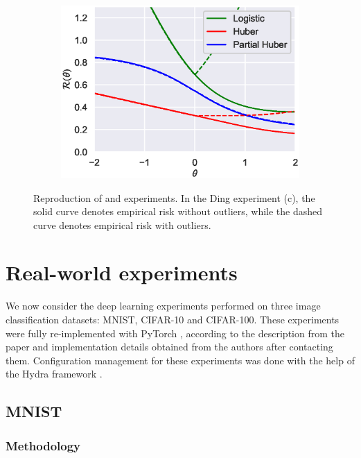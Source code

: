 \begin{figure}[htp]
\begin{subfigure}{0.31\linewidth}
        \includegraphics[width=\columnwidth]{figs/ding_outlier.eps}
    \label{fig:ding-outlier}
  \end{subfigure}
  \caption{Reproduction of \citet{long_random_2010} and \citet{ding_statistical_2013} experiments. 
  In the Ding experiment (c), the solid curve denotes empirical risk without outliers, while the dashed curve denotes empirical risk with outliers.
  }
  \label{fig:synthetic}
\end{figure}

\section{Real-world experiments}
\label{sec:realworld}

We now consider the deep learning experiments performed on three image classification datasets: MNIST, CIFAR-10 and CIFAR-100. These experiments were fully re-implemented with PyTorch \citep{paszke_pytorch_2019}, according to the description from the paper and implementation details obtained from the authors after contacting them. Configuration management for these experiments was done with the help of the Hydra framework \citep{yadan_hydra_2019}.

        
\subsection{MNIST}

\subsubsection{Methodology}


